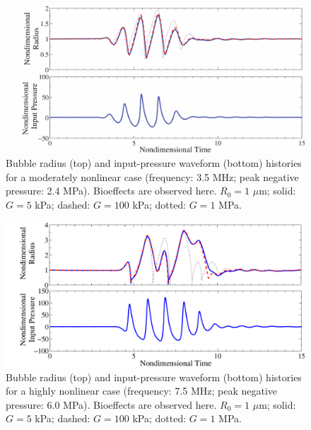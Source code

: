\begin{figure}[!t]
  \centering \includegraphics[width=\textwidth]{figs/bubble_figs/Rt_intermediate}%
  \caption[Bubble radius and input pressure histories for a moderately nonlinear case (frequency: 3.5
    MHz; peak negative pressure: 2.4 MPa)]{Bubble radius (top) and input-pressure
    waveform (bottom) histories for a moderately nonlinear case (frequency: 3.5
    MHz; peak negative pressure: 2.4 MPa). Bioeffects are observed
    here. $R_0=1$ $\mu$m; solid: $G=5$ kPa; dashed: $G=100$ kPa;
    dotted: $G=1$ MPa.}
  \label{fig:sample_bubble_intermediate}
\end{figure}

\begin{figure}[!t]
  \centering \includegraphics[width=\textwidth]{figs/bubble_figs/Rt_nonlinear}
  \caption[Bubble radius and input pressure histories for a highly nonlinear case (frequency: 7.5 MHz;
    peak negative pressure: 6.0 MPa)]{Bubble radius (top) and input-pressure
    waveform (bottom) histories for a highly nonlinear case (frequency: 7.5 MHz;
    peak negative pressure: 6.0 MPa). Bioeffects are observed
    here. $R_0=1$ $\mu$m; solid: $G=5$ kPa; dashed: $G=100$ kPa;
    dotted: $G=1$ MPa.}
  \label{fig:sample_bubble_nonlinear}
\end{figure}

